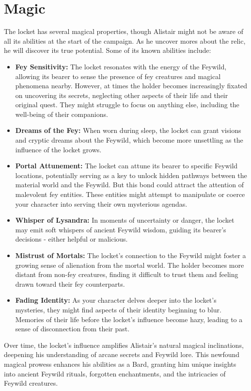 \documentclass[letterpaper,openany,oneside,twocolumn]{book}
\begin{document}
\section*{Magic}
The locket has several magical properties, though Alistair might not be aware of all its abilities at the start of the campaign. As he uncover mores about the relic, he will discover its true potential. Some of its known abilities include:
\begin{itemize}
	\item \textbf{Fey Sensitivity:} The locket resonates with the energy of the Feywild, allowing its bearer to sense the presence of fey creatures and magical phenomena nearby. However, at times the holder becomes increasingly fixated on uncovering its secrets, neglecting other aspects of their life and their original quest. They might struggle to focus on anything else, including the well-being of their companions.
	\item \textbf{Dreams of the Fey:} When worn during sleep, the locket can grant visions and cryptic dreams about the Feywild, which become more unsettling as the influence of the locket grows.
	\item \textbf{Portal Attunement:} The locket can attune its bearer to specific Feywild locations, potentially serving as a key to unlock hidden pathways between the material world and the Feywild. But this bond could attract the attention of malevolent fey entities. These entities might attempt to manipulate or coerce your character into serving their own mysterious agendas.
	\item \textbf{Whisper of Lysandra:} In moments of uncertainty or danger, the locket may emit soft whispers of ancient Feywild wisdom, guiding its bearer's decisions - either helpful or malicious.
	\item \textbf{Mistrust of Mortals:} The locket's connection to the Feywild might foster a growing sense of alienation from the mortal world. The holder becomes more distant from non-fey creatures, finding it difficult to trust them and feeling drawn toward their fey counterparts.
	\item \textbf{Fading Identity:} As your character delves deeper into the locket's mysteries, they might find aspects of their identity beginning to blur. Memories of their life before the locket's influence become hazy, leading to a sense of disconnection from their past.
\end{itemize}
Over time, the locket's influence amplifies Alistair's natural magical inclinations, deepening his understanding of arcane secrets and Feywild lore. This newfound magical prowess enhances his abilities as a Bard, granting him unique insights into ancient Feywild rituals, forgotten enchantments, and the intricacies of Feywild creatures.
\end{document}
